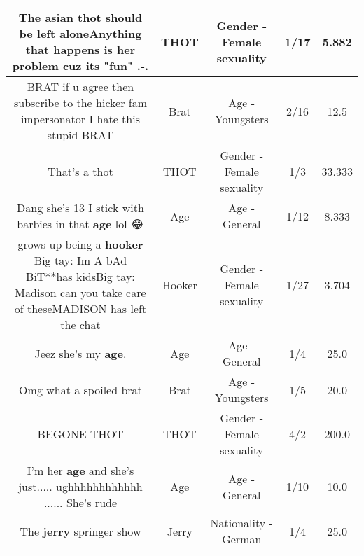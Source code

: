\documentclass[11pt]{article}
\newlength\mylength
\begin{document}
\begin{center}
\begin{longtable}{|C{.65\mylength}|C{.30\mylength}|C{.12\mylength}|C{.12\mylength}|C{.12\mylength}|}
  \small The asian \textbf{thot} should be left aloneAnything that happens is her problem cuz its "fun" .-.\normalsize   & THOT & Gender - Female sexuality & 1/17 & 5.882 \\  \hline
  \small BRAT if u agree then subscribe to the hicker fam impersonator I hate this stupid BRAT\normalsize   & Brat & Age - Youngsters & 2/16 & 12.5 \\  \hline
  \small That's a thot\normalsize   & THOT & Gender - Female sexuality & 1/3 & 33.333 \\  \hline
  \small Dang she's 13 I stick with barbies in that \textbf{age} lol 😂\normalsize   & Age & Age - General & 1/12 & 8.333 \\  \hline
  \small grows up being a \textbf{hooker} Big tay: Im A bAd BiT**has kidsBig tay: Madison can you take care of theseMADISON has left the chat\normalsize   & Hooker & Gender - Female sexuality & 1/27 & 3.704 \\  \hline
  \small Jeez she's my \textbf{age}.\normalsize   & Age & Age - General & 1/4 & 25.0 \\  \hline
  \small Omg what a spoiled brat\normalsize   & Brat & Age - Youngsters & 1/5 & 20.0 \\  \hline
  \small BEGONE THOT\normalsize   & THOT & Gender - Female sexuality & 4/2 & 200.0 \\  \hline
  \small I'm her \textbf{age} and she's just..... ughhhhhhhhhhhh ...... She's rude\normalsize   & Age & Age - General & 1/10 & 10.0 \\  \hline
  \small The \textbf{jerry} springer show\normalsize   & Jerry & Nationality - German & 1/4 & 25.0 \\  \hline

\end{longtable}
\end{center}
\end{document}

